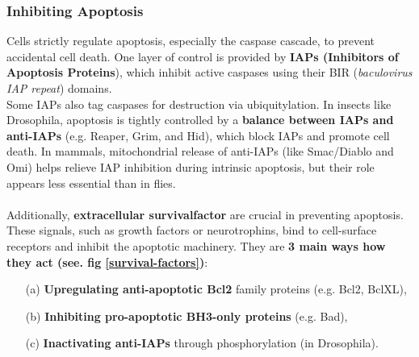 \documentclass[../main.tex]{subfiles}
\begin{document}
\subsubsection{Inhibiting Apoptosis}
\indent Cells strictly regulate apoptosis, especially the caspase cascade, to prevent accidental cell death. One layer of control is provided by \textbf{\gls{IAP}s (Inhibitors of Apoptosis Proteins}), which inhibit active caspases using their BIR (\textit{baculovirus IAP repeat}) domains. \\
\indent Some IAPs also tag caspases for destruction via ubiquitylation. In insects like Drosophila, apoptosis is tightly controlled by a \textbf{balance between IAPs and anti-IAPs} (e.g. Reaper, Grim, and Hid), which block IAPs and promote cell death. In mammals, mitochondrial release of anti-IAPs (like Smac/Diablo and Omi) helps relieve IAP inhibition during intrinsic apoptosis, but their role appears less essential than in flies.\\
\\
\indent Additionally, \textbf{extracellular \gls{survivalfactor}} are crucial in preventing apoptosis. These signals, such as growth factors or neurotrophins, bind to cell-surface receptors and inhibit the apoptotic machinery. They are \textbf{3 main ways how they act (see. fig \ref{survival-factors})}: 
\begin{enumerate}
	\item[(a)] \textbf{Upregulating anti-apoptotic Bcl2} family proteins (e.g. Bcl2, BclXL),
	\item[(b)] \textbf{Inhibiting pro-apoptotic BH3-only proteins} (e.g. Bad),
	\item[(c)] \textbf{Inactivating anti-IAPs} through phosphorylation (in Drosophila).
\end{enumerate}
\end{document}
